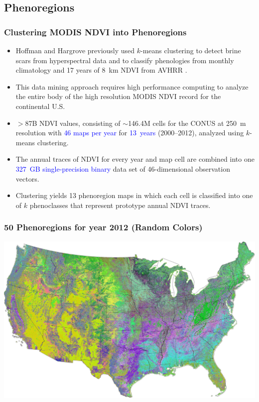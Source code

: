 
\subsection{Phenoregions}
\begin{frame}
 \frametitle{Clustering MODIS NDVI into Phenoregions}
 \vskip-0.10in
 \begin{itemize}\small
  \item Hoffman and Hargrove previously used $k$-means clustering to detect brine scars from hyperspectral data \citep{Hoffman_MS-UTK-Physics_20041104} and to classify phenologies from monthly climatology and 17 years of 8~km NDVI from AVHRR \citep{White_GRL_20050218}.
  \item This data mining approach requires high performance computing to analyze the entire body of the high resolution MODIS NDVI record for the continental U.S.
  \item {\color{blue} $>$87B NDVI values}, consisting of {\color{blue} $\sim$146.4M cells} for the CONUS at 250~m resolution with \textcolor{blue}{46 maps per year} for \textcolor{blue}{13~years} (2000--2012), analyzed using $k$-means clustering.
  \item The annual traces of NDVI for every year and map cell are combined into one \textcolor{blue}{327~GB single-precision binary} data set of 46-dimensional observation vectors.
  \item Clustering yields 13 phenoregion maps in which each cell is classified into one of $k$ phenoclasses that represent prototype annual NDVI traces.
 \end{itemize}
\end{frame}

\begin{frame}
 \frametitle{50 Phenoregions for year 2012 (Random Colors)}
 \includegraphics[width=\textwidth]{figures/phendump.2000-2012.50.2012.large.GIMP.pdf}
\end{frame}

